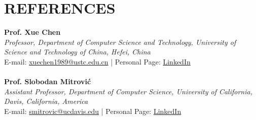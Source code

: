 \documentclass[a4paper,9pt]{extarticle}
\begin{document}

\section*{REFERENCES}

\textbf{Prof. Xue Chen}\\
\textit{Professor, Department of Computer Science and Technology, University of Science and Technology of China, Hefei, China}\\
E-mail: \href{mailto:xuechen1989@ustc.edu.cn}{xuechen1989@ustc.edu.cn} | Personal Page: \href{http://staff.ustc.edu.cn/~xuechen1989/}{LinkedIn} \\ \\
\textbf{Prof. Slobodan Mitrović}\\
\textit{Assistant Professor, Department of Computer Science, University of California, Davis, California, America}\\
E-mail: \href{mailto:smitrovic@ucdavis.edu}{smitrovic@ucdavis.edu} | Personal Page: \href{https://web.cs.ucdavis.edu/~mitrovic/}{LinkedIn} \\ \\
\end{document}
